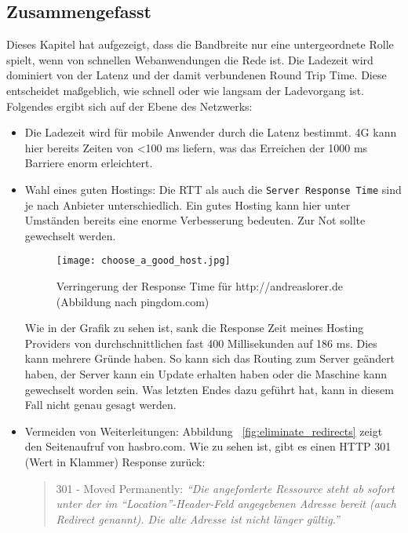 
	\subsection{Zusammengefasst} %
	\label{sub:zusammengefasst_grundlagen}
		Dieses Kapitel hat aufgezeigt, dass die Bandbreite nur eine untergeordnete Rolle spielt, wenn von schnellen Webanwendungen die Rede ist. Die Ladezeit wird dominiert von der Latenz und der damit verbundenen Round Trip Time. Diese entscheidet maßgeblich, wie schnell oder wie langsam der Ladevorgang ist.
		Folgendes ergibt sich auf der Ebene des Netzwerks:
		\begin{itemize}

			\item Die Ladezeit wird für mobile Anwender durch die Latenz bestimmt. 4G kann hier bereits Zeiten von <100 ms liefern, was das Erreichen der 1000 ms Barriere enorm erleichtert.

			\item Wahl eines guten Hostings: Die RTT als auch die \texttt{Server Response Time} sind je nach Anbieter unterschiedlich. Ein gutes Hosting kann hier unter Umständen bereits eine enorme Verbesserung bedeuten. Zur Not sollte gewechselt werden.

			\begin{figure}[htbp]
				\begin{center}
					\texttt{[image: choose\_a\_good\_host.jpg]}
					\caption{Verringerung der Response Time für http://andreaslorer.de (Abbildung nach pingdom.com)}
					\label{fig:choose_a_good_host}
				\end{center}
			\end{figure}
			
			Wie in der Grafik zu sehen ist, sank die Response Zeit meines Hosting Providers von durchschnittlichen fast 400 Millisekunden auf 186 ms. Dies kann mehrere Gründe haben. So kann sich das Routing zum Server geändert haben, der Server kann ein Update erhalten haben oder die Maschine kann gewechselt worden sein. Was letzten Endes dazu geführt hat, kann in diesem Fall nicht genau gesagt werden.

			\item Vermeiden von Weiterleitungen: Abbildung ~\ref{fig:eliminate_redirects} zeigt den Seitenaufruf von hasbro.com. Wie zu sehen ist, gibt es einen HTTP 301 (Wert in Klammer) Response zurück: 

			\begin{quote}
				301 - Moved Permanently: \textit{"`Die angeforderte Ressource steht ab sofort unter der im "`Location"'-Header-Feld angegebenen Adresse bereit (auch Redirect genannt). Die alte Adresse ist nicht länger gültig."'} \autocite{wikipediaHTTP}
			\end{quote}


\end{itemize}
